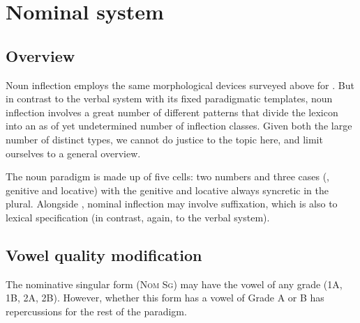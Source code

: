 \documentclass[output=paper,newtxmath,modfonts,nonflat,draftmode]{langsci/langscibook}
\begin{document}
\section{Nominal system}
\subsection{Overview}

Noun inflection employs the same morphological devices surveyed above for . But in contrast to the verbal system with its fixed paradigmatic templates, noun inflection involves a great number of different patterns that divide the lexicon into an as of yet undetermined number of inflection classes. Given both the large number of distinct types, we cannot do justice to the topic here, and limit ourselves to a general overview.

The noun paradigm is made up of five cells: two numbers and three cases (, genitive and locative) with the genitive and locative always syncretic in the plural. Alongside , nominal inflection may involve suffixation, which is also  to lexical specification (in contrast, again, to the verbal system). 

\subsection{Vowel quality modification} 
\largerpage
The nominative singular form (\textsc{Nom Sg}) may have the vowel of any grade (1A, 1B, 2A, 2B). However, whether this form has a vowel of Grade A or B has repercussions for the rest of the paradigm. 
\end{document}
